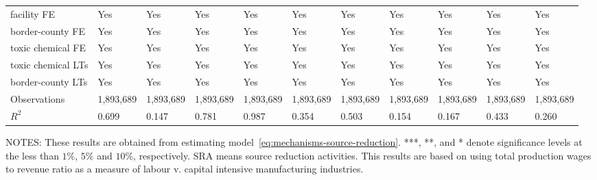 \begin{table}[H]
{\begin{tabular}{@{}lllllllllll@{}}
            facility FE           & Yes       & Yes             & Yes        & Yes                   & Yes            & Yes       & Yes                   & Yes                 & Yes                 & Yes                   \\
            border-county FE      & Yes       & Yes             & Yes        & Yes                   & Yes            & Yes       & Yes                   & Yes                 & Yes                 & Yes                   \\
            toxic chemical FE     & Yes       & Yes             & Yes        & Yes                   & Yes            & Yes       & Yes                   & Yes                 & Yes                 & Yes                   \\
            toxic chemical LTs    & Yes       & Yes             & Yes        & Yes                   & Yes            & Yes       & Yes                   & Yes                 & Yes                 & Yes                   \\
            border-county LTs     & Yes       & Yes             & Yes        & Yes                   & Yes            & Yes       & Yes                   & Yes                 & Yes                 & Yes                   \\\midrule
            Observations          & 1,893,689 & 1,893,689       & 1,893,689  & 1,893,689             & 1,893,689      & 1,893,689 & 1,893,689             & 1,893,689           & 1,893,689             & 1,893,689           \\
            $R^2$                 & 0.699     & 0.147           & 0.781      & 0.987                 & 0.354          & 0.503     & 0.154                 & 0.167               & 0.433               & 0.260                 \\ \bottomrule \bottomrule
        \end{tabular}%
    }
    \begin{minipage}{\columnwidth}
        \vspace{0.05in}
        \tiny NOTES: These results are obtained from estimating model~\ref{eq:mechanisms-source-reduction}. ***, **, and * denote significance levels at the less than $1\%$, $5\%$ and $10\%$, respectively. SRA means source reduction activities. This results are based on using total production wages to revenue ratio as a measure of labour v. capital intensive manufacturing industries.
    \end{minipage}
\end{table}